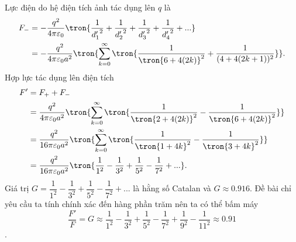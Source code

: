 \begin{loigiai}
\begin{equation*}
    \end{equation*}
    Lực điện do hệ điện tích ảnh tác dụng lên $q$ là
    \begin{equation*}
    \begin{aligned}
         F_-&=-\dfrac{q^2}{4\pi\varepsilon_0}\tron{\dfrac{1}{{d'_1}^2}+\dfrac{1}{{d'_2}^2}+\dfrac{1}{{d'_3}^2}+\dfrac{1}{{d'_4}^2}+...}\\
        &=-\dfrac{q^2}{4\pi\varepsilon_0a^2}\tron{\sum_{k=0}^\infty\tron{\dfrac{1}{\tron{6+4(2k)}^2}+\dfrac{1}{(4+4(2k+1))^2}}}.
    \end{aligned}
    \end{equation*}
    Hợp lực tác dụng lên điện tích
    \begin{equation*}
        \begin{aligned}
            F'&=F_++F_-\\
            &=\dfrac{q^2}{4\pi\varepsilon_0a^2}\tron{\sum_{k=0}^\infty\tron{\dfrac{1}{\tron{2+4(2k)}^2}-\dfrac{1}{\tron{6+4(2k)}^2}}}\\
            &=\dfrac{q^2}{16\pi\varepsilon_0a^2}\tron{\sum_{k=0}^\infty\tron{\dfrac{1}{\tron{1+4k}^2}-\dfrac{1}{\tron{3+4k}^2}}}\\
            &=\dfrac{q^2}{16\pi\varepsilon_0a^2}\tron{\dfrac{1}{1^2}-\dfrac{1}{3^2}+\dfrac{1}{5^2}-\dfrac{1}{7^2}+...}.
        \end{aligned}
    \end{equation*}
    Giá trị $G=\dfrac{1}{1^2}-\dfrac{1}{3^2}+\dfrac{1}{5^2}-\dfrac{1}{7^2}+...$  là hằng số Catalan và $G\approx0.916$. Đề bài chỉ yêu cầu ta tính chính xác đến hàng phần trăm nên ta có thể bấm máy
    $$\dfrac{F'}{F}=G\approx\dfrac{1}{1^2}-\dfrac{1}{3^2}+\dfrac{1}{5^2}-\dfrac{1}{7^2}+\dfrac{1}{9^2}-\dfrac{1}{11^2}\approx0.91$$.
    \end{loigiai}
    
